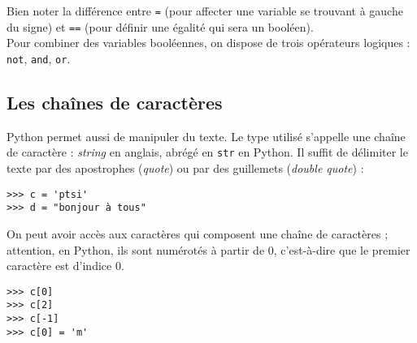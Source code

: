\begin{multicols}{2}
Bien noter la différence entre \texttt{=} (pour affecter une variable se trouvant à gauche du signe) et \texttt{==} (pour définir une égalité qui sera un booléen).\\
Pour combiner des variables booléennes, on dispose de trois opérateurs logiques : \texttt{ not}, \texttt{and}, \texttt{or}. 


\exer{}





\subsection*{Les chaînes de caractères}
Python permet aussi de manipuler du texte. Le type utilisé 
s'appelle une chaîne de caractère : \textit{string} en anglais, abrégé en \texttt{str} en Python. Il suffit de délimiter le texte par des apostrophes (\textit{quote}) ou par des guillemets (\textit{double quote}) :
\begin{lstlisting}
>>> c = 'ptsi'
>>> d = "bonjour à tous"
\end{lstlisting}





On peut avoir accès aux caractères qui composent une chaîne de caractères ; attention, en Python, ils sont numérotés à partir de 0, c'est-à-dire que le premier caractère est d'indice $0$. 


\begin{lstlisting}
>>> c[0]
>>> c[2]
>>> c[-1]
>>> c[0] = 'm' 
\end{lstlisting}


\end{multicols}
